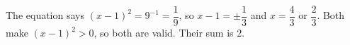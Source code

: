 The equation says $(x-1)^2=9^{-1}=\dfrac{1}{9}$, so $x-1=\pm\dfrac{1}{3}$ and $x=\dfrac{4}{3}$ or $\dfrac{2}{3}$. Both make $(x-1)^2>0$, so both are valid. Their sum is $\boxed{2}$.
